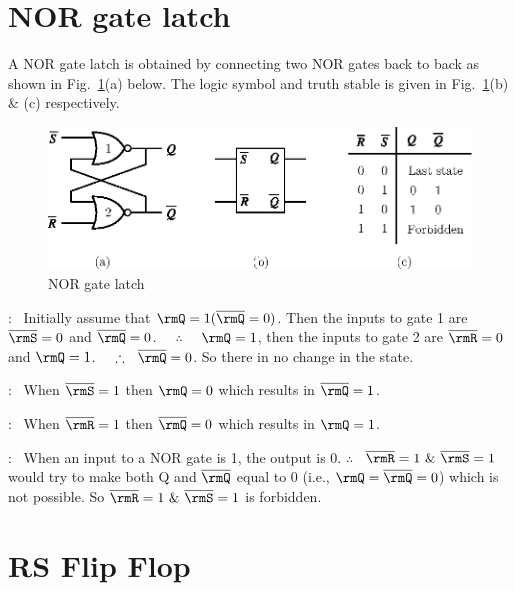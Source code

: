 \section{NOR gate latch}\label{sec6.3}
A NOR gate latch is obtained by connecting two NOR gates back to back
as shown in Fig.~\ref{fig6.3}(a) below. The logic symbol and truth
stable is given in Fig.~\ref{fig6.3}(b) \& (c) respectively.
\begin{figure}[H]
\centering
\includegraphics[scale=1.05]{chap6/fig6.3.eps}
\caption{NOR gate latch}\label{fig6.3}
\end{figure}

 :~ Initially assume
that $\rmQ =1 (\overline{\rmQ}=0)$. Then the inputs to gate 1 are
$\overline{\rmS}=0$ and $\overline{\rmQ}=0$. ~~$\therefore$ ~~$\rmQ = 1$, then the inputs
to gate 2 are $\overline{\rmR}=0$ and $\rmQ=1$. ~~$\therefore~~ \overline{\rmQ}=0$. So there in no change in the state.

 :~ When $\overline{\rmS}=1$
then $\rmQ =0$ which results in $\overline{\rmQ} =1$.

\eject

 :~ When $\overline{\rmR} =1$ then
$\overline{\rmQ} =0$ which results in $\rmQ =1$.


 :~ When an input to a NOR
gate is 1, the output is 0. $\therefore$~ $\overline{\rmR} = 1 ~\&~ \overline{\rmS}
=1$ would try to make both Q and $\overline{\rmQ}$ equal to 0 (i.e., $\rmQ
= \overline{\rmQ}=0$) which is not possible. So $\overline{\rmR} =1 ~\&~ \overline{\rmS} =1$
is forbidden.

\section{RS Flip Flop}\label{sec6.4}

